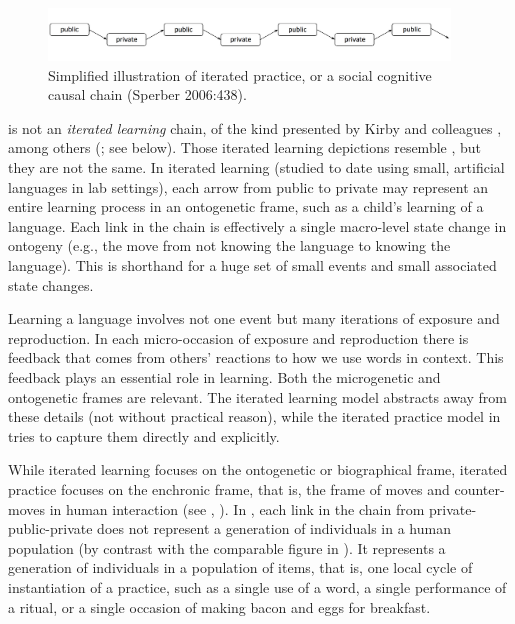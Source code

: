 \begin{figure}[h]
\includegraphics[width=0.95\textwidth,keepaspectratio]{figures/ch02fig01}
\caption{Simplified illustration of iterated practice, or a social 
cognitive causal chain (Sperber 2006:438).}
\label{iteratedpractice}
\end{figure}



 is not an \textit{iterated learning} chain, of the kind presented by 
Kirby and colleagues \citep{kirby_ug_2004,kirby_cumulative_2008}, among 
others (\citealt{christiansen_language_2008}; see below). Those iterated learning depictions resemble , 
but they are not the same. In iterated learning (studied to date using small, artificial languages in lab settings), each arrow from public 
to private may represent an entire learning process in an ontogenetic frame, such as a child's 
learning of a language. Each link in the chain is effectively a single 
macro-level state change in ontogeny (e.g., the move from not knowing 
the language to knowing the language). This is shorthand for a huge set 
of small events and small associated state changes. 



Learning a language involves not one event but many iterations of 
exposure and reproduction. In each micro-occasion of exposure and 
reproduction there is feedback that comes from others' reactions to how we use words in context. This feedback plays 
an essential role in learning. Both the microgenetic and ontogenetic frames are relevant. The iterated learning model abstracts 
away from these details (not without practical reason), while the 
iterated practice model in  tries to capture them directly and 
explicitly. 



While iterated learning focuses on the ontogenetic or biographical 
frame, iterated practice focuses on the enchronic 
frame, that is, the frame of moves and counter-moves in 
human interaction (see \citealt[10]{enfield_anatomy_2009}, \citeyear[Chapter 4]{enfield_relationship_2013}). In , each link in the chain from 
private-public-private does not represent a generation of individuals in 
a human population (by contrast with the comparable figure in 
\citealt{christiansen_language_2008}). It represents a generation of individuals 
in a population of items, that is, one local cycle of 
instantiation of a practice, such as a single use of a word, a single 
performance of a ritual, or a single occasion of making bacon and eggs 
for breakfast. 



